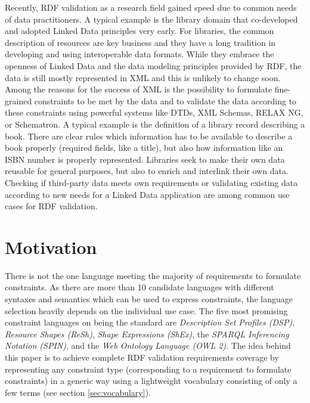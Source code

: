 \documentclass{llncs}
\begin{document}
Recently, RDF validation as a research field gained speed due to common needs of data practitioners. A typical example is the library domain that co-developed and adopted Linked Data principles very early. For libraries, the common description of resources are key business and they have a long tradition in developing and using interoperable data formats. While they embrace the openness of Linked Data and the data modeling principles provided by RDF, the data is still mostly represented in XML and this is unlikely to change soon. 
Among the reasons for the success of XML is the possibility to formulate fine-grained constraints to be met by the data and to validate the data according to these constraints using powerful systems like DTDs, XML Schemas, RELAX NG, or Schematron.
A typical example is the definition of a library record describing a book. There are clear rules which information has to be available to describe a book properly (required fields, like a title), but also how information like an ISBN number is properly represented. Libraries seek to make their own data reusable for general purposes, but also to enrich and interlink their own data. Checking if third-party data meets own requirements or validating existing data according to new needs for a Linked Data application are among common use cases for RDF validation.

\section{Motivation}

There is not the one language meeting the majority of requirements to formulate constraints.
As there are more than 10 candidate languages with different syntaxes and semantics which can be used to express constraints, 
the language selection heavily depends on the individual use case.
The five most promising constraint languages on being the standard are
\emph{Description Set Profiles (DSP)},
\emph{Resource Shapes (ReSh)}, 
\emph{Shape Expressions (ShEx)},
the \emph{SPARQL Inferencing Notation (SPIN)}, 
and the \emph{Web Ontology Language (OWL 2)}.
The idea behind this paper is to achieve complete RDF validation requirements coverage by representing any constraint type (corresponding to a requirement to formulate constraints) in a generic way using a lightweight vocabulary consisting of only a few terms (see section \ref{sec:vocabulary}).
\end{document}
